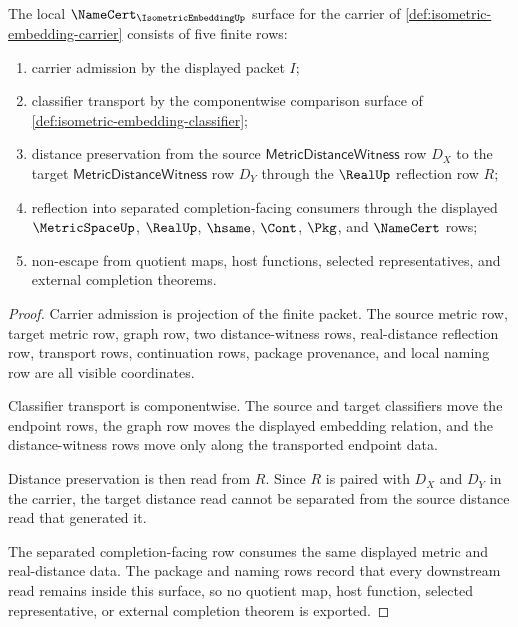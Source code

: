 \begin{theorem}
\label{thm:isometric-embedding-namecert-obligations}
The local $\NameCert_{\IsometricEmbeddingUp}$ surface for the carrier of \autoref{def:isometric-embedding-carrier} consists of five finite rows:
\begin{enumerate}
\item carrier admission by the displayed packet $I$;
\item classifier transport by the componentwise comparison surface of \autoref{def:isometric-embedding-classifier};
\item distance preservation from the source $\mathsf{MetricDistanceWitness}$ row $D_X$ to the target $\mathsf{MetricDistanceWitness}$ row $D_Y$ through the $\RealUp$ reflection row $R$;
\item reflection into separated completion-facing consumers through the displayed $\MetricSpaceUp$, $\RealUp$, $\hsame$, $\Cont$, $\Pkg$, and $\NameCert$ rows;
\item non-escape from quotient maps, host functions, selected representatives, and external completion theorems.
\end{enumerate}
\end{theorem}
\begin{proof}
Carrier admission is projection of the finite packet. The source metric row, target metric row, graph row, two distance-witness rows, real-distance reflection row, transport rows, continuation rows, package provenance, and local naming row are all visible coordinates.

Classifier transport is componentwise. The source and target classifiers move the endpoint rows, the graph row moves the displayed embedding relation, and the distance-witness rows move only along the transported endpoint data.

Distance preservation is then read from $R$. Since $R$ is paired with $D_X$ and $D_Y$ in the carrier, the target distance read cannot be separated from the source distance read that generated it.

The separated completion-facing row consumes the same displayed metric and real-distance data. The package and naming rows record that every downstream read remains inside this surface, so no quotient map, host function, selected representative, or external completion theorem is exported.
\end{proof}

